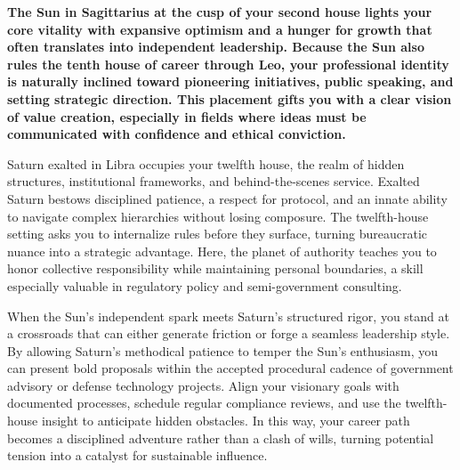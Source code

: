 
\label{topic45}

{\fontsize{9.5}{13.8}\selectfont\bfseries\color{DeepSlate} The Sun in Sagittarius at the cusp of your second house lights your core vitality with expansive optimism and a hunger for growth that often translates into independent leadership. Because the Sun also rules the tenth house of career through Leo, your professional identity is naturally inclined toward pioneering initiatives, public speaking, and setting strategic direction. This placement gifts you with a clear vision of value creation, especially in fields where ideas must be communicated with confidence and ethical conviction.}\par\vspace{2mm}

{\fontsize{9}{13}\selectfont Saturn exalted in Libra occupies your twelfth house, the realm of hidden structures, institutional frameworks, and behind-the-scenes service. Exalted Saturn bestows disciplined patience, a respect for protocol, and an innate ability to navigate complex hierarchies without losing composure. The twelfth-house setting asks you to internalize rules before they surface, turning bureaucratic nuance into a strategic advantage. Here, the planet of authority teaches you to honor collective responsibility while maintaining personal boundaries, a skill especially valuable in regulatory policy and semi-government consulting.}\par\vspace{1.8mm}

{\fontsize{9}{13}\selectfont When the Sun's independent spark meets Saturn's structured rigor, you stand at a crossroads that can either generate friction or forge a seamless leadership style. By allowing Saturn's methodical patience to temper the Sun's enthusiasm, you can present bold proposals within the accepted procedural cadence of government advisory or defense technology projects. Align your visionary goals with documented processes, schedule regular compliance reviews, and use the twelfth-house insight to anticipate hidden obstacles. In this way, your career path becomes a disciplined adventure rather than a clash of wills, turning potential tension into a catalyst for sustainable influence.}\par\vspace{1.8mm}

